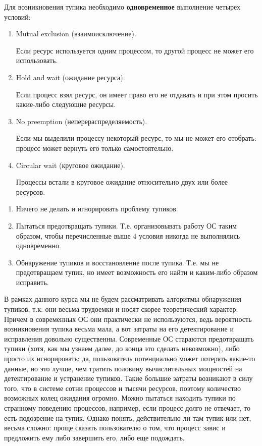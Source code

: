 
Для возникновения тупика необходимо \textbf{одновременное} выполнение четырех
условий:

\begin{enumerate}
\item
  Mutual exclusion (взаимоисключение).

  Если ресурс используется одним процессом, то другой процесс не может его
  использовать.

\item
  Hold and wait (ожидание ресурса).

  Если процесс взял ресурс, он имеет право его не отдавать и при этом просить
  какие-либо следующие ресурсы.

\item
  No preemption (неперераспределяемость).
  
  Если мы выделили процессу некоторый ресурс, то мы не может его отобрать:
  процесс может вернуть его только самостоятельно.

\item
  Circular wait (круговое ожидание).

  Процессы встали в круговое ожидание относительно двух или более ресурсов.
\end{enumerate}


\begin{enumerate}
\item
  Ничего не делать и игнорировать проблему тупиков.

\item
  Пытаться предотвращать тупики. Т.е. организовывать работу ОС таким образом,
  чтобы перечисленные выше \(4\) условия никогда не выполнялись одновременно.

\item
  Обнаружение тупиков и восстановление после тупика. Т.е. мы не предотвращаем
  тупик, но имеет возможность его найти и каким-либо образом исправить.
\end{enumerate}

В рамках данного курса мы не будем рассматривать алгоритмы обнаружения тупиков,
т.к. они весьма трудоемки и носят скорее теоретический характер. Причем в
современных ОС они практически не используются, ведь вероятность возникновения
тупика весьма мала, а вот затраты на его детектирование и исправления довольно
существенны. Современные ОС стараются предотвращать тупики (хотя, как мы узнаем
далее, до конца это сделать невозможно), либо просто их игнорировать: да,
пользователь потенциально может потерять какие-то данные, но это лучше, чем
тратить половину вычислительных мощностей на детектирование и устранение
тупиков. Такие большие затраты возникают в силу того, что в системе сотни
процессов и тысячи ресурсов, поэтому количество возможных колец ожидания
огромно. Можно пытаться находить тупики по странному поведению процессов,
например, если процесс долго не отвечает, то есть подозрение на тупик. Однако
понять, действительно ли там тупик или нет, весьма сложно: проще сказать
пользователю о том, что процесс завис и предложить ему либо завершить его, либо
еще подождать.

